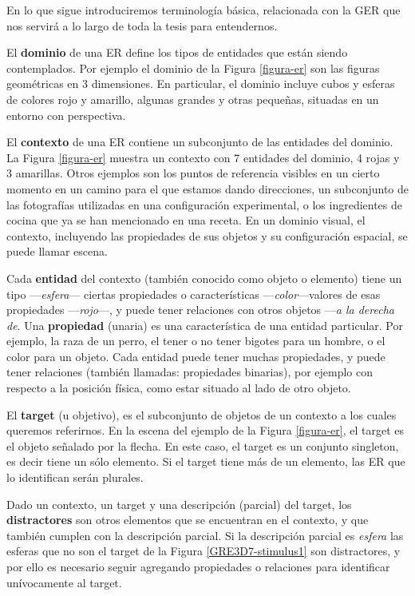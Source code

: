 En lo que sigue introduciremos terminolog\'ia b\'asica, relacionada con la GER que nos servir\'a a lo largo de toda la tesis para entendernos.

El {\bf dominio} de una ER define los tipos de entidades que est\'an siendo contemplados. Por ejemplo el dominio de la Figura \ref{figura-er} son las figuras geom\'etricas en 3 dimensiones. En particular, el dominio incluye cubos y esferas de colores rojo y amarillo, algunas grandes y otras peque\~nas, situadas en un entorno con perspectiva.

El {\bf contexto} de una ER contiene un subconjunto de las entidades del dominio. La Figura \ref{figura-er} muestra un contexto con 7 entidades del dominio, 4 rojas y 3 amarillas. Otros ejemplos son los puntos de referencia visibles en un cierto momento en un camino para el que estamos dando direcciones, un subconjunto de las fotograf\'ias utilizadas en una configuraci\'on experimental, o los ingredientes de cocina que ya se han mencionado en una receta. En un dominio visual, el contexto, incluyendo las propiedades de sus objetos y su configuraci\'on espacial, se puede llamar escena. %

Cada {\bf entidad} del contexto (tambi\'en conocido como objeto o elemento) tiene un tipo ---\emph{esfera}--- ciertas propiedades o caracter\'isticas ---\emph{color}---valores de esas propiedades ---\emph{rojo}---, y puede tener relaciones con otros objetos ---\emph{a la derecha de}. Una {\bf propiedad} (unaria) es una caracter\'istica de una entidad particular. Por ejemplo, la raza de un perro, el tener o no tener bigotes para un hombre, o el color para un objeto. Cada entidad puede tener muchas propiedades, y puede tener relaciones (tambi\'en llamadas: propiedades binarias), por ejemplo con respecto a la posici\'on f\'isica, como estar situado al lado de otro objeto. 

El {\bf target} (u objetivo), es el subconjunto de objetos de un contexto a los cuales queremos referirnos. En la escena del ejemplo de la Figura \ref{figura-er}, el target es el objeto se\~nalado por la flecha. En este caso, el target es un conjunto singleton, es decir tiene un s\'olo elemento. Si el target tiene m\'as de un elemento, las ER que lo identifican ser\'an plurales.

Dado un contexto, un target y una descripci\'on (parcial) del target, los {\bf distractores} son otros elementos que se encuentran en el contexto, y que tambi\'en cumplen con la descripci\'on parcial. Si la descripci\'on parcial es {\it esfera} las esferas que no son el target de la Figura \ref{GRE3D7-stimulus1} son  distractores, y por ello es necesario seguir agregando propiedades o relaciones para identificar un\'ivocamente al target.

